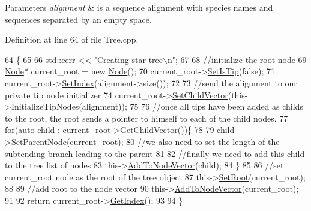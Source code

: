 \begin{DoxyParams}{Parameters}
{\em alignment} & is a sequence alignment with species names and sequences separated by an empty space. \\
\hline
\end{DoxyParams}


Definition at line 64 of file Tree.\+cpp.


\begin{DoxyCode}
64                                                        \{
65   
66   std::cerr << \textcolor{stringliteral}{"Creating star tree\(\backslash\)n"};
67   
68   \textcolor{comment}{//initialize the root node}
69   \hyperlink{classNode}{Node}* current\_root = \textcolor{keyword}{new} \hyperlink{classNode}{Node}();
70   current\_root->\hyperlink{classNode_a89bff92e3930d521439395ccf332418f}{SetIsTip}(\textcolor{keyword}{false});
71   current\_root->\hyperlink{classNode_a6f2acc7b954108a6fe266838fce50ef6}{SetIndex}(alignment->size());
72   
73   \textcolor{comment}{//send the alignment to our private tip node initializer}
74   current\_root->\hyperlink{classNode_a7480924f7879b04fe8c787f42ee888fe}{SetChildVector}(this->InitializeTipNodes(alignment));
75 
76   \textcolor{comment}{//once all tips have been added as childs to the root, the root sends a pointer to himself to each of the
       child nodes.}
77   \textcolor{keywordflow}{for}(\textcolor{keyword}{auto} child : current\_root->\hyperlink{classNode_a9b9823315fd95dcd24aac97316de2859}{GetChildVector}())\{
78     
79     child->SetParentNode(current\_root);
80     \textcolor{comment}{//we also need to set the length of the subtending branch leading to the parent}
81     
82     \textcolor{comment}{//finally we need to add this child to the tree list of nodes}
83     this->\hyperlink{classTree_aba172068387b9b5be1a6750a30e8199a}{AddToNodeVector}(child);
84   \}
85 
86   \textcolor{comment}{//set current\_root node as the root of the tree object}
87   this->\hyperlink{classTree_ae592faa2c1f2da3cc1157bd9a4b884b5}{SetRoot}(current\_root);
88   
89   \textcolor{comment}{//add root to the node vector  }
90   this->\hyperlink{classTree_aba172068387b9b5be1a6750a30e8199a}{AddToNodeVector}(current\_root);
91   
92   \textcolor{keywordflow}{return} current\_root->\hyperlink{classNode_a90ff01054aa65ec8338b78a792ea4bfe}{GetIndex}();
93   
94 \}
\end{DoxyCode}
\mbox{\label{classTree_a5812392cfc9ed68d1fc3713d708a5e8f}} 
